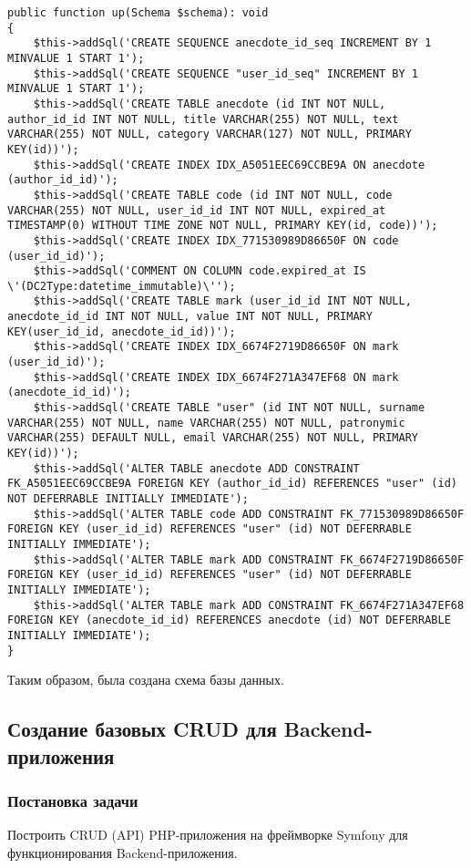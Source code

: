 \documentclass[pract]{SCWorks}
\begin{document}
\begin{verbatim}
public function up(Schema $schema): void
{
    $this->addSql('CREATE SEQUENCE anecdote_id_seq INCREMENT BY 1 MINVALUE 1 START 1');
    $this->addSql('CREATE SEQUENCE "user_id_seq" INCREMENT BY 1 MINVALUE 1 START 1');
    $this->addSql('CREATE TABLE anecdote (id INT NOT NULL, author_id_id INT NOT NULL, title VARCHAR(255) NOT NULL, text VARCHAR(255) NOT NULL, category VARCHAR(127) NOT NULL, PRIMARY KEY(id))');
    $this->addSql('CREATE INDEX IDX_A5051EEC69CCBE9A ON anecdote (author_id_id)');
    $this->addSql('CREATE TABLE code (id INT NOT NULL, code VARCHAR(255) NOT NULL, user_id_id INT NOT NULL, expired_at TIMESTAMP(0) WITHOUT TIME ZONE NOT NULL, PRIMARY KEY(id, code))');
    $this->addSql('CREATE INDEX IDX_771530989D86650F ON code (user_id_id)');
    $this->addSql('COMMENT ON COLUMN code.expired_at IS \'(DC2Type:datetime_immutable)\'');
    $this->addSql('CREATE TABLE mark (user_id_id INT NOT NULL, anecdote_id_id INT NOT NULL, value INT NOT NULL, PRIMARY KEY(user_id_id, anecdote_id_id))');
    $this->addSql('CREATE INDEX IDX_6674F2719D86650F ON mark (user_id_id)');
    $this->addSql('CREATE INDEX IDX_6674F271A347EF68 ON mark (anecdote_id_id)');
    $this->addSql('CREATE TABLE "user" (id INT NOT NULL, surname VARCHAR(255) NOT NULL, name VARCHAR(255) NOT NULL, patronymic VARCHAR(255) DEFAULT NULL, email VARCHAR(255) NOT NULL, PRIMARY KEY(id))');
    $this->addSql('ALTER TABLE anecdote ADD CONSTRAINT FK_A5051EEC69CCBE9A FOREIGN KEY (author_id_id) REFERENCES "user" (id) NOT DEFERRABLE INITIALLY IMMEDIATE');
    $this->addSql('ALTER TABLE code ADD CONSTRAINT FK_771530989D86650F FOREIGN KEY (user_id_id) REFERENCES "user" (id) NOT DEFERRABLE INITIALLY IMMEDIATE');
    $this->addSql('ALTER TABLE mark ADD CONSTRAINT FK_6674F2719D86650F FOREIGN KEY (user_id_id) REFERENCES "user" (id) NOT DEFERRABLE INITIALLY IMMEDIATE');
    $this->addSql('ALTER TABLE mark ADD CONSTRAINT FK_6674F271A347EF68 FOREIGN KEY (anecdote_id_id) REFERENCES anecdote (id) NOT DEFERRABLE INITIALLY IMMEDIATE');
}
\end{verbatim}

Таким образом, была создана схема базы данных.

\subsection{Создание базовых CRUD для Backend-приложения}
\subsubsection{Постановка задачи}
Построить CRUD (API) PHP-приложения на фреймворке Symfony для функционирования
Backend-приложения. 
\end{document}
